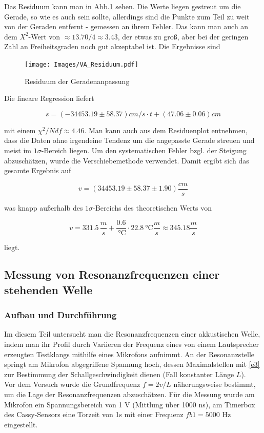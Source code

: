 \documentclass[]{article}
\begin{document}
	Das Residuum kann man in Abb.\ref{Va_Res} sehen. Die Werte liegen gestreut um die Gerade, so wie es auch sein sollte, allerdings sind die Punkte zum Teil zu weit von der Geraden entfernt - gemessen an ihrem Fehler. Das kann man auch an dem $X^2$-Wert von $\approx13.70/4\approx3.43$, der etwas zu groß, aber bei der geringen Zahl an Freiheitsgraden noch gut akzeptabel ist.
	Die Ergebnisse sind 



	\begin{figure}
	\begin{center}
		\texttt{[image: Images/VA\_Residuum.pdf]}
		\caption{Residuum der Geradenanpassung}
		\label{Va_Res}
	\end{center}
	\end{figure}
	
Die lineare Regression liefert

\begin{equation*}
s = (-34453.19\pm58.37) cm/s\cdot t+ (47.06\pm0.06)cm
\end{equation*}

mit einem $\chi^2/Ndf \approx 4.46$. Man kann auch aus dem Residuenplot entnehmen, dass die Daten ohne irgendeine Tendenz um die angepasste Gerade streuen und meist im $1\sigma$-Bereich liegen. Um den systematischen Fehler bzgl. der Steigung abzuschätzen, wurde die Verschiebemethode verwendet. Damit ergibt sich das gesamte Ergebnis auf

\begin{equation*}
	v = (34453.19\pm58.37\pm1.90) \frac{cm}{s}
\end{equation*}

was knapp außerhalb des $1\sigma$-Bereichs des theoretischen Werts von

\begin{equation*}
v = 331.5 \, \frac{m}{s} +\frac{0.6}{\SI{} {\celsius}} \cdot \SI{22.8}{\celsius} \frac{m}{s} \approx 345.18 \frac{m}{s}
\end{equation*}

liegt.

	
	\subsection{Messung von Resonanzfrequenzen einer stehenden Welle}
	\subsubsection{Aufbau und Durchführung}
	Im diesem Teil untersucht man die Resonanzfrequenzen einer akkustischen Welle, indem man ihr Profil durch Variieren der Frequenz eines von einem Lautsprecher erzeugten Testklangs mithilfe eines Mikrofons aufnimmt. An der Resonanzstelle springt am Mikrofon abgegriffene Spannung hoch, dessen Maximalstellen mit \ref{e3} zur Bestimmung der Schallgeschwindigkeit dienen (Fall konstanter Länge $L$).\\
	Vor dem Versuch wurde die Grundfrequenz $f=2v/L$ näherungsweise bestimmt, um die Lage der Resonanzfrequenzen abzuschätzen. Für die Messung wurde  am Mikrofon ein Spannungsbereich von 1 V (Mittlung über 1000 ns), am Timerbox des Cassy-Sensors eine Torzeit von 1s mit einer Frequenz $fb1=5000$ Hz eingestellt.
	
\end{document}
